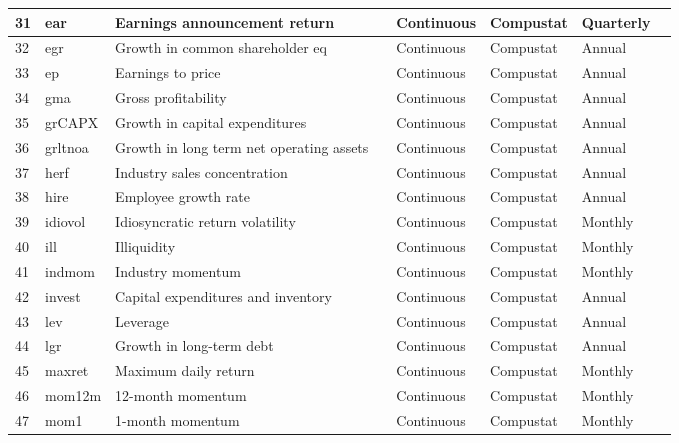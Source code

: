 \documentclass[a4paper, table]{article}
\begin{document}
\begin{landscape}
\begin{table}
\begin{center}
\begin{longtable}{llllllll}
			31 & ear & Earnings announcement return & 
				\cite{brandt_earnings_2008} & Continuous & Compustat & Quarterly \\ \hline
			32 & egr & Growth in common shareholder eq & 
				\cite{richardson_accrual_2005} & Continuous & Compustat & Annual \\
			33 & ep & Earnings to price & 
				\cite{basu_investment_1977} & Continuous & Compustat & Annual \\
			34 & gma & Gross profitability & 
				\cite{novy-marx_other_2013} & Continuous & Compustat & Annual \\
			35 & grCAPX & Growth in capital expenditures & 
				\cite{anderson_empirical_2006} & Continuous & Compustat & Annual \\
			36 & grltnoa & Growth in long term net operating assets & 
				\cite{fairfield_accrued_2003} & Continuous & Compustat & Annual \\
			37 & herf & Industry sales concentration & 
				\cite{hou_industry_2006} & Continuous & Compustat & Annual \\
			38 & hire & Employee growth rate & 
				\cite{belo_labor_2014} & Continuous & Compustat & Annual \\
			39 & idiovol & Idiosyncratic return volatility & 
				\cite{ali_arbitrage_2003} & Continuous & Compustat & Monthly \\
			40 & ill & Illiquidity & 
				\cite{amihud_illiquidity_2002} & Continuous & Compustat & Monthly \\
			41 & indmom & Industry momentum & 
				\cite{moskowitz_industries_1999} & Continuous & Compustat & Monthly \\
			42 & invest & Capital expenditures and inventory & 
				\cite{chen_better_2010} & Continuous & Compustat & Annual \\
			43 & lev & Leverage & 
				\cite{bhandari_debt/equity_1988} & Continuous & Compustat & Annual \\
			44 & lgr & Growth in long-term debt & 
				\cite{richardson_accrual_2005} & Continuous & Compustat & Annual \\
			45 & maxret & Maximum daily return & 
				\cite{bali_maxing_2011} & Continuous & Compustat & Monthly \\
			46 & mom12m & 12-month momentum & 
				\cite{jegadeesh_evidence_1990} & Continuous & Compustat & Monthly \\
			47 & mom1 & 1-month momentum & 
				\cite{jegadeesh_returns_1993} & Continuous & Compustat & Monthly \\

\end{longtable}
\end{center}
\end{table}
\end{landscape}
\end{document}
